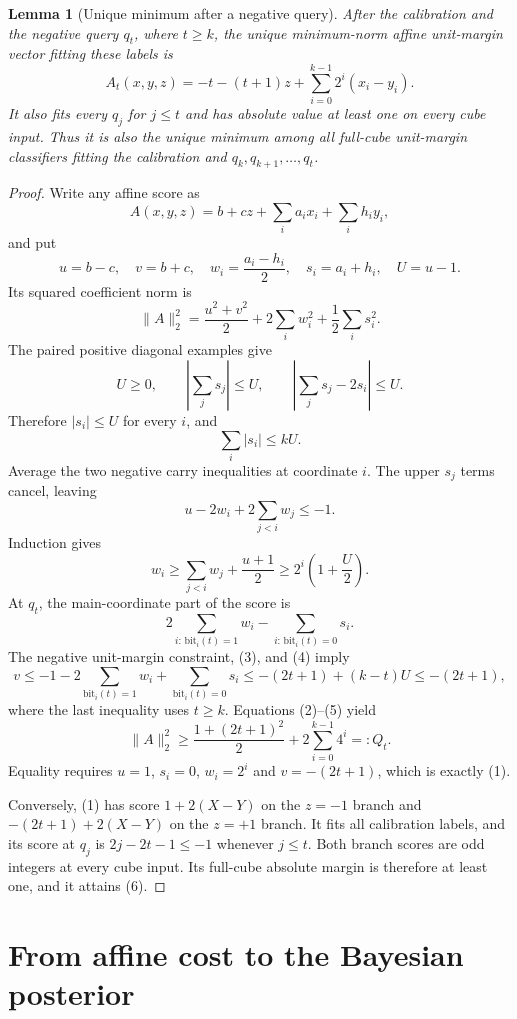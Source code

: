 \documentclass[11pt]{article}
\newtheorem{lemma}[theorem]{Lemma}
\theoremstyle{remark}\newtheorem{remark}[theorem]{Remark}
\begin{document}
\begin{lemma}[Unique minimum after a negative query]\label{lem:minimum}
After the calibration and the negative query $q_t$, where $t\ge k$,
the unique minimum-norm affine unit-margin vector fitting these labels is
\[
 A_t(x,y,z)=-t-(t+1)z+\sum_{i=0}^{k-1}2^i(x_i-y_i).
 \tag{1}\label{eq:At}
\]
It also fits every $q_j$ for $j\le t$ and has absolute value at least one
on every cube input. Thus it is also the unique minimum among all
full-cube unit-margin classifiers fitting the calibration and
$q_k,q_{k+1},\ldots,q_t$.
\end{lemma}
\begin{proof}
Write any affine score as
\[
 A(x,y,z)=b+cz+\sum_i a_i x_i+\sum_i h_i y_i,
\]
and put
\[
 u=b-c,\quad v=b+c,\quad
 w_i=\frac{a_i-h_i}{2},\quad s_i=a_i+h_i,\quad U=u-1.
\]
Its squared coefficient norm is
\[
 \|A\|_2^2=\frac{u^2+v^2}{2}
                  +2\sum_i w_i^2+\frac12\sum_i s_i^2.       \tag{2}
\]
The paired positive diagonal examples give
\[
 U\ge0,\qquad
 \left|\sum_j s_j\right|\le U,\qquad
 \left|\sum_j s_j-2s_i\right|\le U.
\]
Therefore $|s_i|\le U$ for every $i$, and
\[
 \sum_i|s_i|\le kU.                                      \tag{3}
\]
Average the two negative carry inequalities at coordinate $i$. The upper
$s_j$ terms cancel, leaving
\[
 u-2w_i+2\sum_{j<i}w_j\le-1.
\]
Induction gives
\[
 w_i\ge\sum_{j<i}w_j+\frac{u+1}{2}
       \ge2^i\left(1+\frac U2\right).                    \tag{4}
\]
At $q_t$, the main-coordinate part of the score is
\[
 2\sum_{i:\,\mathrm{bit}_i(t)=1}w_i
       -\sum_{i:\,\mathrm{bit}_i(t)=0}s_i.
\]
The negative unit-margin constraint, (3), and (4) imply
\[
 v\le-1-2\sum_{\mathrm{bit}_i(t)=1}w_i
             +\sum_{\mathrm{bit}_i(t)=0}s_i
   \le -(2t+1)+(k-t)U
   \le -(2t+1),                                         \tag{5}
\]
where the last inequality uses $t\ge k$. Equations (2)--(5) yield
\[
 \|A\|_2^2\ge
      \frac{1+(2t+1)^2}{2}+2\sum_{i=0}^{k-1}4^i=:Q_t.    \tag{6}
\]
Equality requires $u=1$, $s_i=0$, $w_i=2^i$ and $v=-(2t+1)$,
which is exactly (1).

Conversely, (1) has score $1+2(X-Y)$ on the $z=-1$ branch and
$-(2t+1)+2(X-Y)$ on the $z=+1$ branch. It fits all calibration labels,
and its score at $q_j$ is $2j-2t-1\le-1$ whenever $j\le t$.
Both branch scores are odd integers at every cube input. Its full-cube
absolute margin is therefore at least one, and it attains (6).
\end{proof}

\section{From affine cost to the Bayesian posterior}
\end{document}
